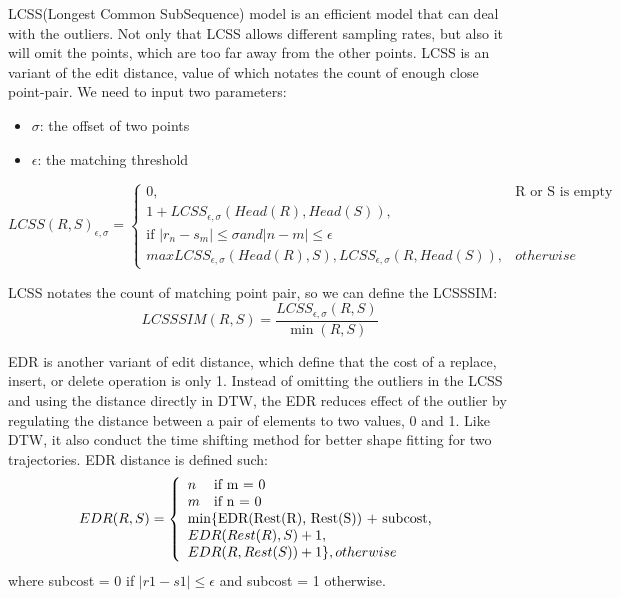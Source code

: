 LCSS(Longest Common SubSequence) model is an efficient model that can deal with the outliers. Not only that LCSS allows different sampling rates, but also it will omit the points, which are too far away from the other points. LCSS is an variant of the edit distance, value of which notates the count of enough close point-pair. We need to input two parameters:
\begin{itemize}
	\item $\sigma$: the offset of two points
	\item $\epsilon$: the matching threshold 
\end{itemize} 
\begin{equation}
	LCSS(R, S)_{\epsilon, \sigma} = \left\{
	\begin{array}{ll}
		0, & \text{R or S is empty} \\
		1 + LCSS_{\epsilon, \sigma}(Head(R), Head(S)), \\
		\text{if $|r_n - s_m| \leq \sigma and |n - m| \leq \epsilon$} \\
		max{LCSS_{\epsilon, \sigma}(Head(R), S), LCSS_{\epsilon, \sigma}(R, Head(S))}, & otherwise
	\end{array}
	\right.
\end{equation}

LCSS notates the count of matching point pair, so we can define the LCSSSIM:
\begin{equation}\label{sim:less}
	LCSSSIM(R,S)=\frac{LCSS_{\epsilon ,\sigma }(R,S)}{\min(R,S)}
\end{equation}

EDR is another variant of edit distance, which define that the cost of a replace, insert, or delete operation is only 1. Instead of omitting the outliers in the LCSS and using the distance directly in DTW, the EDR reduces effect of the outlier by regulating the distance between a pair of elements to two values, 0 and 1. Like DTW, it also conduct the time shifting method for better shape fitting for two trajectories. EDR distance is defined such:
\begin{equation}
	EDR(R, S) = \left\{
	\begin{array}{ll}
		n & \text{if m = 0} \\
		m & \text{if n = 0} \\
		\multicolumn{2}{l}{\text{min\{EDR(Rest(R), Rest(S)) + subcost,}} \\
		\multicolumn{2}{l}{EDR(Rest(R), S) + 1, } \\
		\multicolumn{2}{l}{EDR(R, Rest(S)) + 1\}, otherwise}  
	\end{array}
	\right.
\end{equation}
where subcost = 0 if $|r1 - s1| \leq \epsilon$ and subcost = 1 otherwise.

